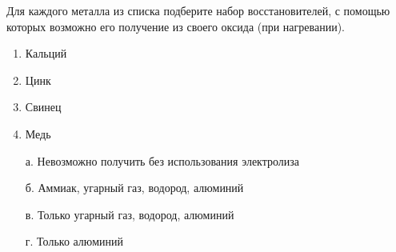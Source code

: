 
Для каждого металла из списка подберите набор восстановителей, с помощью
которых возможно его получение из своего оксида (при нагревании).

\begin{enumerate}
    \item Кальций  
    \item Цинк 
    \item Свинец 
    \item Медь
\end{enumerate}

\begin{enumerate}
    \item[а.] Невозможно получить без использования электролиза
    \item[б.] Аммиак, угарный газ, водород, алюминий
    \item[в.] Только угарный газ, водород, алюминий 
    \item[г.] Только алюминий
\end{enumerate}

